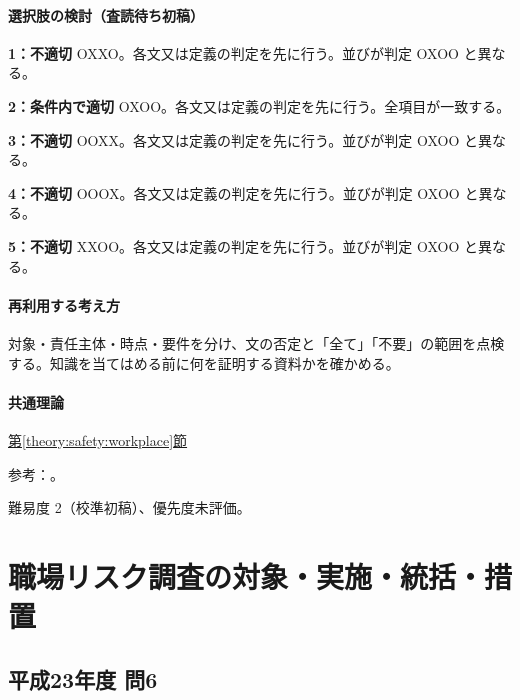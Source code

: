 \paragraph{選択肢の検討（査読待ち初稿）}\mbox{}\par

\noindent\textbf{1：不適切} OXXO。各文又は定義の判定を先に行う。並びが判定 OXOO と異なる。\par

\noindent\textbf{2：条件内で適切} OXOO。各文又は定義の判定を先に行う。全項目が一致する。\par

\noindent\textbf{3：不適切} OOXX。各文又は定義の判定を先に行う。並びが判定 OXOO と異なる。\par

\noindent\textbf{4：不適切} OOOX。各文又は定義の判定を先に行う。並びが判定 OXOO と異なる。\par

\noindent\textbf{5：不適切} XXOO。各文又は定義の判定を先に行う。並びが判定 OXOO と異なる。\par

\paragraph{再利用する考え方} 対象・責任主体・時点・要件を分け、文の否定と「全て」「不要」の範囲を点検する。知識を当てはめる前に何を証明する資料かを確かめる。

\paragraph{共通理論} \hyperref[theory:safety:workplace]{第\ref*{theory:safety:workplace}節}

\par 参考：\cite{saf53_workplace2006,saf_parliament2006}。

\par 難易度 2（校準初稿）、優先度未評価。

\section{職場リスク調査の対象・実施・統括・措置}

\subsection{平成23年度 問6}
\label{q:h23-reg-apt-06}

